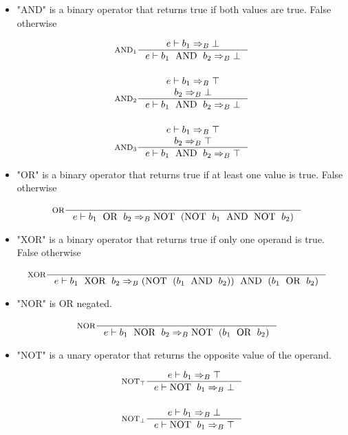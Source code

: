 \begin{itemize}
\item "AND" is a binary operator that returns true if both values are true. False otherwise

\begin{align*}
&\inference[$\text{AND}_1$]{e \vdash b_1 \Rightarrow_B \bot}
                    {e \vdash b_1 \Tand b_2 \Rightarrow_B \bot}
\\\\
&\inference[$\text{AND}_2$]{e \vdash b_1 \Rightarrow_B \top \\ b_2 \Rightarrow_B \bot}
                    {e \vdash b_1 \Tand b_2 \Rightarrow_B \bot}
\\\\
&\inference[$\text{AND}_3$]{e \vdash b_1 \Rightarrow_B \top \\ b_2 \Rightarrow_B \top}
                    {e \vdash b_1 \Tand b_2 \Rightarrow_B \top}
\end{align*}


\item "OR" is a binary operator that returns true if at least one value is true. False otherwise

\begin{align*}
&\inference[OR]{}
                 {e \vdash b_1 \Tor b_2 \Rightarrow_B \Tnot(\Tnot b_1 \Tand \Tnot b_2)}
\end{align*}

\item "XOR" is a binary operator that returns true if only one operand is true. False otherwise

\begin{align*}
&\inference[XOR]{}
                  {e \vdash b_1 \Txor b_2 \Rightarrow_B (\Tnot(b_1 \Tand b_2)) \Tand (b_1 \Tor b_2)}
\end{align*}

\item "NOR" is OR negated.

\begin{align*}
&\inference[NOR]{}
                   {e \vdash b_1 \Tnor b_2 \Rightarrow_B \Tnot( b_1 \Tor b_2 )}
\end{align*}

\item "NOT" is a unary operator that returns the opposite value of the operand.

\begin{align*}
&\inference[$\text{NOT}_\top$]{e \vdash b_1 \Rightarrow_B \top}
                       {e \vdash \Tnot b_1 \Rightarrow_B \bot}
\\\\
&\inference[$\text{NOT}_\bot$]{e \vdash b_1 \Rightarrow_B \bot}
                       {e \vdash \Tnot b_1 \Rightarrow_B \top}
\end{align*}


\end{itemize}
